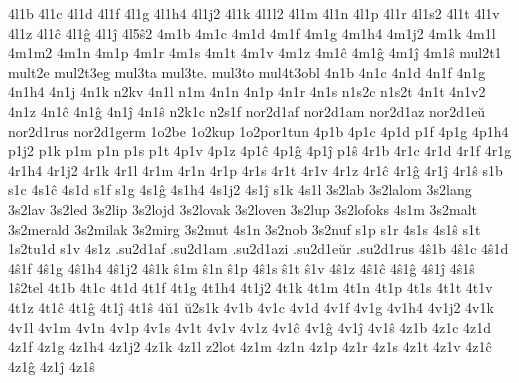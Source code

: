 {%
4l1b 4l1c 4l1d 4l1f 4l1g 4l1h4 4l1j2 4l1k 4l1l2 4l1m 4l1n 4l1p 4l1r 4l1s2
4l1t 4l1v 4l1z 4l1ĉ 4l1ĝ 4l1ĵ 4l5ŝ2 %
4m1b 4m1c 4m1d 4m1f 4m1g 4m1h4 4m1j2
4m1k 4m1l 4m1m2 4m1n 4m1p 4m1r 4m1s 4m1t 4m1v 4m1z 4m1ĉ 4m1ĝ 4m1ĵ 4m1ŝ
mul2t1 mult2e mul2t3eg mul3ta mul3te. mul3to mul4t3obl
%
4n1b 4n1c 4n1d 4n1f 4n1g 4n1h4 4n1j 4n1k
n2kv
4n1l n1m 4n1n 4n1p 4n1r 4n1s
n1s2c n1s2t
4n1t
4n1v2
4n1z 4n1ĉ 4n1ĝ 4n1ĵ 4n1ŝ
n2k1c n2s1f
nor2d1af nor2d1am nor2d1az nor2d1eŭ nor2d1rus nor2d1germ
%
1o2be 1o2kup 1o2por1tun
%
4p1b 4p1c 4p1d p1f 4p1g 4p1h4 p1j2 p1k p1m p1n p1s p1t 4p1v 4p1z 4p1ĉ
4p1ĝ 4p1ĵ p1ŝ
%
4r1b 4r1c 4r1d 4r1f 4r1g 4r1h4 4r1j2 4r1k 4r1l 4r1m 4r1n 4r1p 4r1s 4r1t
4r1v 4r1z 4r1ĉ 4r1ĝ 4r1ĵ 4r1ŝ
%
s1b s1c 4s1ĉ 4s1d s1f s1g 4s1ĝ 4s1h4 4s1j2 4s1ĵ s1k
4s1l 3s2lab 3s2lalom 3s2lang 3s2lav 3s2led 3s2lip 3s2lojd 3s2lovak
3s2loven 3s2lup 3s2lofoks
4s1m 3s2malt 3s2merald 3s2milak 3s2mirg 3s2mut %
4s1n 3s2nob 3s2nuf
s1p s1r 4s1s 4s1ŝ
s1t 1s2tu1d
s1v 4s1z
.su2d1af .su2d1am .su2d1azi .su2d1eŭr .su2d1rus
%
4ŝ1b 4ŝ1c 4ŝ1d 4ŝ1f 4ŝ1g 4ŝ1h4 4ŝ1j2 4ŝ1k ŝ1m ŝ1n ŝ1p
4ŝ1s ŝ1t ŝ1v 4ŝ1z 4ŝ1ĉ 4ŝ1ĝ 4ŝ1ĵ 4ŝ1ŝ
1ŝ2tel
%
4t1b 4t1c 4t1d 4t1f 4t1g 4t1h4 4t1j2 4t1k 4t1m 4t1n 4t1p 4t1s 4t1t 4t1v
4t1z 4t1ĉ 4t1ĝ 4t1ĵ 4t1ŝ
%
4ŭ1 ŭ2s1k
%
4v1b 4v1c 4v1d 4v1f 4v1g 4v1h4 4v1j2 4v1k 4v1l 4v1m 4v1n 4v1p 4v1s 4v1t 4v1v
4v1z 4v1ĉ 4v1ĝ 4v1ĵ 4v1ŝ
%
4z1b 4z1c 4z1d 4z1f 4z1g 4z1h4 4z1j2 4z1k 4z1l
z2lot
4z1m 4z1n 4z1p 4z1r 4z1s 4z1t 4z1v 4z1ĉ 4z1ĝ 4z1ĵ 4z1ŝ
}         %
\endgroup
\endinput

%
%
%
%
%
%
%
%
%
